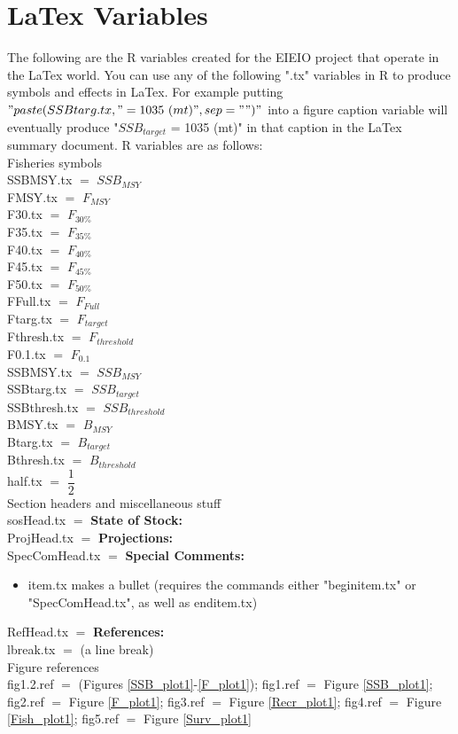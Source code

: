 \documentclass[]{report}
\begin{document}
\section*{LaTex Variables}
\raggedright
The following are the R variables created for the EIEIO project that operate in the LaTex world.  You can use any of the following ".tx" variables in R to produce symbols and effects in LaTex.  For example putting $"paste(SSBtarg.tx," = 1035\ (mt)",sep="")"$ into a figure caption variable will eventually produce "$SSB_{target}$ = 1035 (mt)" in that caption in the LaTex summary document.  R variables are as follows:\\  
\vspace{1cm}
  Fisheries symbols
  \\ 
  SSBMSY.tx $=$ $SSB_{MSY}$ \\
  FMSY.tx $=$ $F_{MSY}$ \\
  F30.tx $=$ $F_{30\%}$ \\
  F35.tx $=$ $F_{35\%}$  \\
  F40.tx $=$ $F_{40\%}$  \\
  F45.tx $=$ $F_{45\%}$  \\
  F50.tx $=$ $F_{50\%}$    \\
  FFull.tx $=$ $F_{Full}$ \\
  Ftarg.tx $=$ $F_{target}$ \\ 
  Fthresh.tx $=$ $F_{threshold}$ \\ 
  F0.1.tx $=$ $F_{0.1}$    \\
  SSBMSY.tx $=$ $SSB_{MSY}$ \\
  SSBtarg.tx $=$ $SSB_{target}$\\  
  SSBthresh.tx $=$ $SSB_{threshold}$\\ 
  BMSY.tx $=$ $B_{MSY}$ \\
  Btarg.tx $=$ $B_{target}$\\  
  Bthresh.tx $=$ $B_{threshold}$\\    
  half.tx $=$ $\dfrac{1}{2}$    \\
  
  \vspace{1cm}
  Section headers and miscellaneous stuff 
	\\  
  sosHead.tx $=$ \textbf{State of Stock:} \\  
  ProjHead.tx $=$ \textbf{Projections:}   \\
  SpecComHead.tx $=$ \textbf{Special Comments:} \begin{itemize}   
   \item item.tx makes a bullet (requires the commands either "beginitem.tx" or "SpecComHead.tx", as well as enditem.tx) \end{itemize}
  RefHead.tx $=$ \textbf{References:} \\
  lbreak.tx $=$ \linebreak  (a line break) \\
\vspace{1cm} 
  Figure references
  \\
  fig1.2.ref $=$ (Figures \ref{SSB_plot1}-\ref{F_plot1});
  fig1.ref $=$ Figure \ref{SSB_plot1};
  fig2.ref $=$ Figure \ref{F_plot1}; 	
  fig3.ref $=$ Figure \ref{Recr_plot1};	   
  fig4.ref $=$ Figure \ref{Fish_plot1}; 	
  fig5.ref $=$ Figure \ref{Surv_plot1}
\end{document}
